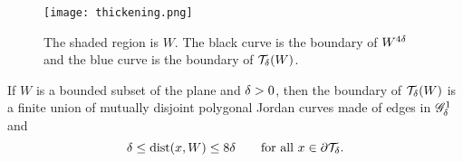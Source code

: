 \documentclass{amsart}
\DeclareMathOperator{\dist}{dist}
\begin{document}

\begin{figure}[h]
\begin{center}
\texttt{[image: thickening.png]}
\caption{The shaded region is $W$. 
The black curve is the boundary of $W^{4\delta}$ and the blue curve is the boundary of $\mathcal{T}_{\delta}(W)$.}
\label{fig:4}
\end{center}
\end{figure}

\begin{lemma}[{\cite[Lemma 2.1]{MM2}}]\label{lem:MM}
If $W$ is a bounded subset of the plane and $\delta>0$, then the boundary of $\mathcal{T}_{\delta}(W)$ is a finite union of mutually disjoint polygonal Jordan curves made of edges in $\mathscr{G}^1_{\delta}$ and
\begin{equation}\label{eq:MM} 
\d \leq \dist(x,W) \leq 8\d\qquad \text{for all $x\in\partial\mathcal{T}_{\d}$}.
\end{equation}
\end{lemma}

\end{document}
